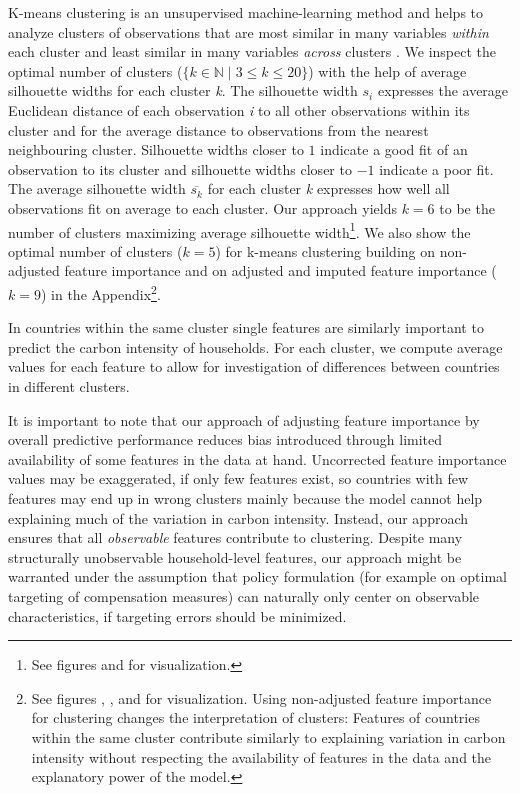 \documentclass[12pt, a4paper]{article}
\begin{document}
K-means clustering is an unsupervised machine-learning method and helps to analyze clusters of observations that are most similar in many variables \textit{within} each cluster and least similar in many variables \textit{across} clusters \autocite{MacQueen.1967}. We inspect the optimal number of clusters ($\{k \in \mathbb{N} \mid 3  \leq k \leq 20 \}$) with the help of average silhouette widths \autocite{Rousseeuw.1987} for each cluster \textit{k}. The silhouette width $s_{i}$ expresses the average Euclidean distance of each observation \textit{i} to all other observations within its cluster and for the average distance to observations from the nearest neighbouring cluster. Silhouette widths closer to $1$ indicate a good fit of an observation to its cluster and silhouette widths closer to $-1$ indicate a poor fit. The average silhouette width $\overline{s_{k}}$ for each cluster \textit{k} expresses how well all observations fit on average to each cluster. Our approach yields $k = 6$ to be the number of clusters maximizing average silhouette width\footnote{See figures  and  for visualization.}. We also show the optimal number of clusters ($k = 5$) for k-means clustering building on non-adjusted feature importance and on adjusted and imputed feature importance ($k=9$) in the Appendix\footnote{See figures , ,  and  for visualization. Using non-adjusted feature importance for clustering changes the interpretation of clusters: Features of countries within the same cluster contribute similarly to explaining variation in carbon intensity without respecting the availability of features in the data and the explanatory power of the model.}.

In countries within the same cluster single features are similarly important to predict the carbon intensity of households. For each cluster, we compute average values for each feature to allow for investigation of differences between countries in different clusters.%

It is important to note that our approach of adjusting feature importance by overall predictive performance reduces bias introduced through limited availability of some features in the data at hand. Uncorrected feature importance values may be exaggerated, if only few features exist, so countries with few features may end up in wrong clusters mainly because the model cannot help explaining much of the variation in carbon intensity. Instead, our approach ensures that all \textit{observable} features contribute to clustering. Despite many structurally unobservable household-level features, our approach might be warranted under the assumption that policy formulation (for example on optimal targeting of compensation measures) can naturally only center on observable characteristics, if targeting errors should be minimized.
\end{document}
